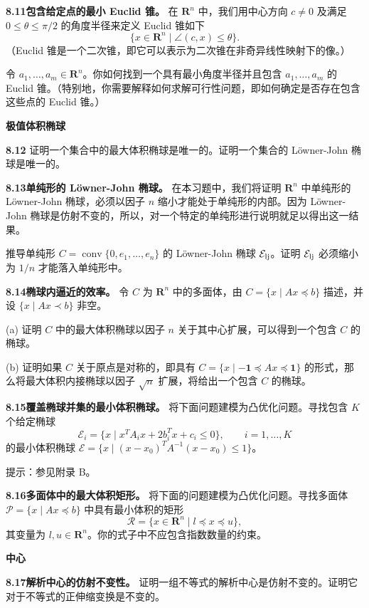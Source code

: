 \documentclass[UTF8,12pt,a4paper,fontset=fandol]{ctexart}
\begin{document}
\noindent\textbf{8.11\quad 包含给定点的最小 Euclid 锥。}
在 $\mathbf{R}^n$ 中，我们用中心方向 $c\neq 0$ 及满足 $0\leq\theta\leq\pi/2$ 的角度半径来定义 Euclid 锥如下
\[
\{x\in\mathbf{R}^n\mid \angle(c,x)\leq\theta\}.
\]
（Euclid 锥是一个二次锥，即它可以表示为二次锥在非奇异线性映射下的像。）

令 $a_1,\ldots,a_m\in\mathbf{R}^n$。你如何找到一个具有最小角度半径并且包含 $a_1,\ldots,a_m$ 的 Euclid 锥。（特别地，你需要解释如何求解可行性问题，即如何确定是否存在包含这些点的 Euclid 锥。）

\noindent\textbf{极值体积椭球}

\noindent\textbf{8.12}
证明一个集合中的最大体积椭球是唯一的。证明一个集合的 Löwner-John 椭球是唯一的。

\noindent\textbf{8.13\quad 单纯形的 Löwner-John 椭球。}
在本习题中，我们将证明 $\mathbf{R}^n$ 中单纯形的 Löwner-John 椭球，必须以因子 $n$ 缩小才能处于单纯形的内部。因为 Löwner-John 椭球是仿射不变的，所以，对一个特定的单纯形进行说明就足以得出这一结果。

推导单纯形 $C=\operatorname{conv}\{0,e_1,\ldots,e_n\}$ 的 Löwner-John 椭球 $\mathcal E_{\rm lj}$。证明 $\mathcal E_{\rm lj}$ 必须缩小为 $1/n$ 才能落入单纯形中。

\noindent\textbf{8.14\quad 椭球内逼近的效率。}
令 $C$ 为 $\mathbf{R}^n$ 中的多面体，由 $C=\{x\mid Ax\preceq b\}$ 描述，并设 $\{x\mid Ax\prec b\}$ 非空。

(a) 证明 $C$ 中的最大体积椭球以因子 $n$ 关于其中心扩展，可以得到一个包含 $C$ 的椭球。

(b) 证明如果 $C$ 关于原点是对称的，即具有 $C=\{x\mid -\mathbf{1}\preceq Ax\preceq \mathbf{1}\}$ 的形式，那么将最大体积内接椭球以因子 $\sqrt n$ 扩展，将给出一个包含 $C$ 的椭球。

\noindent\textbf{8.15\quad 覆盖椭球并集的最小体积椭球。}
将下面问题建模为凸优化问题。寻找包含 $K$ 个给定椭球
\[
\mathcal E_i=\{x\mid x^TA_ix+2b_i^Tx+c_i\leq 0\},\qquad i=1,\ldots,K
\]
的最小体积椭球 $\mathcal E=\{x\mid (x-x_0)^TA^{-1}(x-x_0)\leq 1\}$。

提示：参见附录 B。

\noindent\textbf{8.16\quad 多面体中的最大体积矩形。}
将下面的问题建模为凸优化问题。寻找多面体 $\mathcal P=\{x\mid Ax\preceq b\}$ 中具有最小体积的矩形
\[
\mathcal R=\{x\in\mathbf{R}^n\mid l\preceq x\preceq u\},
\]
其变量为 $l,u\in\mathbf{R}^n$。你的式子中不应包含指数数量的约束。

\noindent\textbf{中心}

\noindent\textbf{8.17\quad 解析中心的仿射不变性。}
证明一组不等式的解析中心是仿射不变的。证明它对于不等式的正伸缩变换是不变的。
\end{document}
